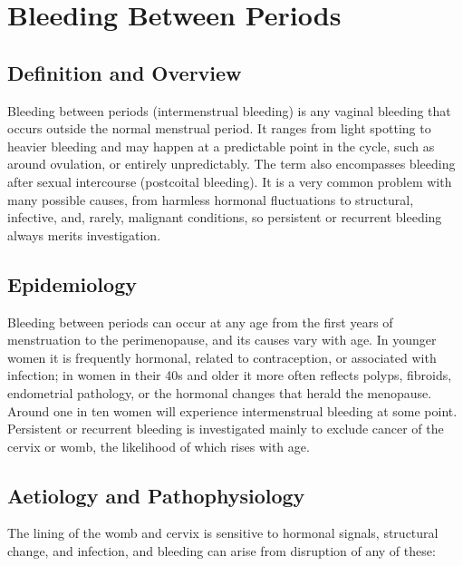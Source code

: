 \chapter{Bleeding Between Periods}

\section*{Definition and Overview}
Bleeding between periods (intermenstrual bleeding) is any vaginal bleeding that occurs outside the normal menstrual period. It ranges from light spotting to heavier bleeding and may happen at a predictable point in the cycle, such as around ovulation, or entirely unpredictably. The term also encompasses bleeding after sexual intercourse (postcoital bleeding). It is a very common problem with many possible causes, from harmless hormonal fluctuations to structural, infective, and, rarely, malignant conditions, so persistent or recurrent bleeding always merits investigation.

\section*{Epidemiology}
Bleeding between periods can occur at any age from the first years of menstruation to the perimenopause, and its causes vary with age. In younger women it is frequently hormonal, related to contraception, or associated with infection; in women in their 40s and older it more often reflects polyps, fibroids, endometrial pathology, or the hormonal changes that herald the menopause. Around one in ten women will experience intermenstrual bleeding at some point. Persistent or recurrent bleeding is investigated mainly to exclude cancer of the cervix or womb, the likelihood of which rises with age.

\section*{Aetiology and Pathophysiology}
The lining of the womb and cervix is sensitive to hormonal signals, structural change, and infection, and bleeding can arise from disruption of any of these:

